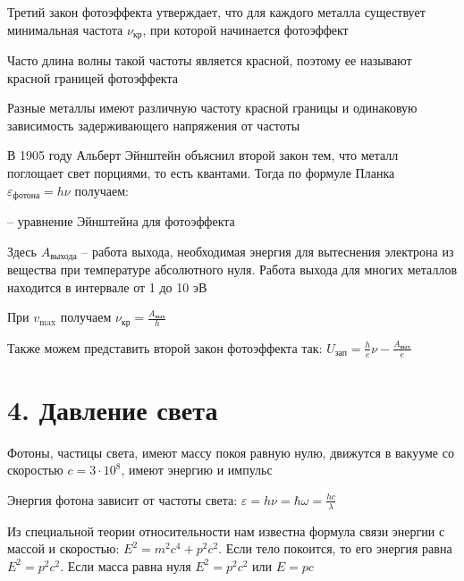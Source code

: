 \documentclass[12pt]{article}
\begin{document}
Третий закон фотоэффекта утверждает, что для каждого металла существует минимальная частота $\nu_{\text{кр}}$, при которой начинается фотоэффект

Часто длина волны такой частоты является красной, поэтому ее называют красной границей фотоэффекта

Разные металлы имеют различную частоту красной границы и одинаковую зависимость задерживающего напряжения от частоты

\mediumvspace

В 1905 году Альберт Эйнштейн объяснил второй закон тем, что металл поглощает свет порциями, то есть квантами. Тогда по формуле Планка $\varepsilon_{\text{фотона}} = h \nu$ получаем:

 -- уравнение Эйнштейна для фотоэффекта

\smallvspace

Здесь $A_{\text{выхода}}$ -- работа выхода, необходимая энергия для вытеснения электрона из вещества при температуре абсолютного нуля. Работа выхода для многих металлов находится в интервале от 1 до 10 эВ

При $v_{\max}$ получаем $\nu_\text{кр} = \frac{A_\text{вых}}{h}$

Также можем представить второй закон фотоэффекта так: $U_\text{зап} = \frac{h}{e} \nu - \frac{A_\text{вых}}{e}$








\section{4. Давление света}

Фотоны, частицы света, имеют массу покоя равную нулю, движутся в вакууме со скоростью $c = 3 \cdot 10^8$, имеют энергию и импульс

Энергия фотона зависит от частоты света: $\varepsilon = h \nu = \hbar \omega = \frac{h c}{\lambda}$

Из специальной теории относительности нам известна формула связи энергии с массой и скоростью: $E^2 = m^2 c^4 + p^2 c^2$. Если тело покоится, то его энергия равна $E^2 = p^2 c^2$. Если масса равна нуля $E^2 = p^2 c^2$ или $E = p c$
\end{document}
